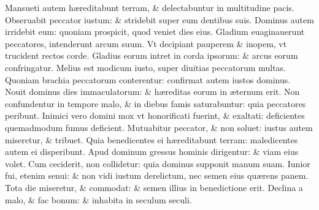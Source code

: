 \documentclass[a5paper,10pt]{book}
\def\ae{æ}
\begin{document}
\begin{multicols*}{2}
\newline \color{red} M\color{black}ansueti autem h\ae reditabunt terram, \& delectabuntur in multitudine pacis.
\newline \color{red} O\color{black}bseruabit peccator iustum: \& stridebit super eum dentibus suis.
\newline \color{red} D\color{black}ominus autem irridebit eum: quoniam prospicit, quod veniet dies eius.
\newline \color{red} G\color{black}ladium euaginauerunt peccatores, intenderunt arcum suum.
\newline \color{red} V\color{black}t decipiant pauperem \& inopem, vt trucident rectos corde.%
\newline \color{red} G\color{black}ladius eorum intret in corda ipsorum: \& arcus eorum confringatur.
\newline \color{red} M\color{black}elius est modicum iusto, super diuitias peccatorum multas.
\newline \color{red} Q\color{black}uoniam brachia peccatorum conterentur: confirmat autem iustos dominus.
\newline \color{red} N\color{black}ouit dominus dies immaculatorum: \& h\ae reditas eorum in \ae ternum erit.
\newline \color{red} N\color{black}on confundentur in tempore malo, \& in diebus famis saturabuntur: quia peccatores peribunt.
\newline \color{red} I\color{black}nimici vero domini mox vt honorificati fuerint, \& exaltati: deficientes quemadmodum fumus deficient.
\newline \color{red} M\color{black}utuabitur peccator, \& non soluet: iustus autem miseretur, \& tribuet.
\newline \color{red} Q\color{black}uia benedicentes ei h\ae reditabunt terram: maledicentes autem ei disperibunt.
\newline \color{red} A\color{black}pud dominum gressus hominis dirigentur: \& viam eius volet.
\newline \color{red} C\color{black}um ceciderit, non collidetur: quia dominus supponit manum suam.
\newline \color{red} I\color{black}unior fui, etenim senui: \& non vidi iustum derelictum, nec semen eius qu\ae rens panem.
\newline \color{red} T\color{black}ota die miseretur, \& commodat: \& semen illius in benedictione erit.
\newline \color{red} D\color{black}eclina a malo, \& fac bonum: \& inhabita in seculum seculi.

\end{multicols*}
\end{document}
